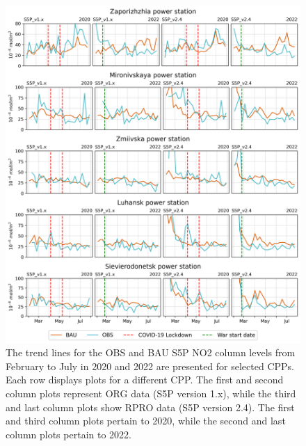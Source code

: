 \begin{figure}
    \centering
    \includegraphics[width=\textwidth]{figs/chap3/fig9.png}
    \caption{The trend lines for the OBS and BAU S5P NO2 column levels from February to July in 2020 and 2022 are presented for selected CPPs. Each row displays plots for a different CPP. The first and second column plots represent ORG data (S5P version 1.x), while the third and last column plots show RPRO data (S5P version 2.4). The first and third column plots pertain to 2020, while the second and last column plots pertain to 2022.}
    \label{fig:fig9}
\end{figure}
